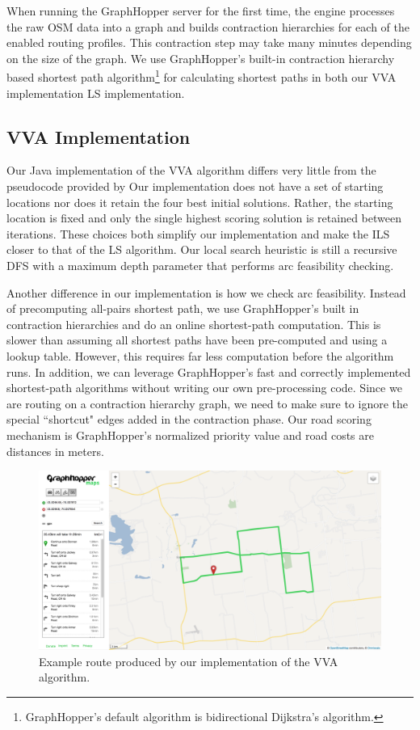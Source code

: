\documentclass[honors]{union-cs-thesis}
\begin{document}
When running the GraphHopper server for the first time, the engine processes the raw OSM data into a graph and builds contraction hierarchies for each of the enabled routing profiles. This contraction step may take many minutes depending on the size of the graph. We use GraphHopper's built-in contraction hierarchy based shortest path algorithm\footnote{GraphHopper's default algorithm is bidirectional Dijkstra's algorithm.} for calculating shortest paths in both our VVA implementation LS implementation.

\subsection{VVA Implementation}
Our Java implementation of the VVA algorithm differs very little from the pseudocode provided by \citeauthor{verbeeck2014extension} Our implementation does not have a set of starting locations nor does it retain the four best initial solutions. Rather, the starting location is fixed and only the single highest scoring solution is retained between iterations. These choices both simplify our implementation and make the ILS closer to that of the LS algorithm. Our local search heuristic is still a recursive DFS with a maximum depth parameter that performs arc feasibility checking.

Another difference in our implementation is how we check arc feasibility. Instead of precomputing all-pairs shortest path, we use GraphHopper's built in contraction hierarchies and do an online shortest-path computation. This is slower than assuming all shortest paths have been pre-computed and using a lookup table. However, this requires far less computation before the algorithm runs. In addition, we can leverage GraphHopper's fast and correctly implemented shortest-path algorithms without writing our own pre-processing code. Since we are routing on a contraction hierarchy graph, we need to make sure to ignore the special ``shortcut" edges added in the contraction phase. Our road scoring mechanism is GraphHopper's normalized priority value and road costs are distances in meters.

\begin{figure}
    \begin{center}
        \includegraphics[width=\textwidth]{figs/vva-route}
    \end{center}
    \caption{Example route produced by our implementation of the VVA algorithm.}
    \label{fig:vva-example}
\end{figure}
\end{document}
